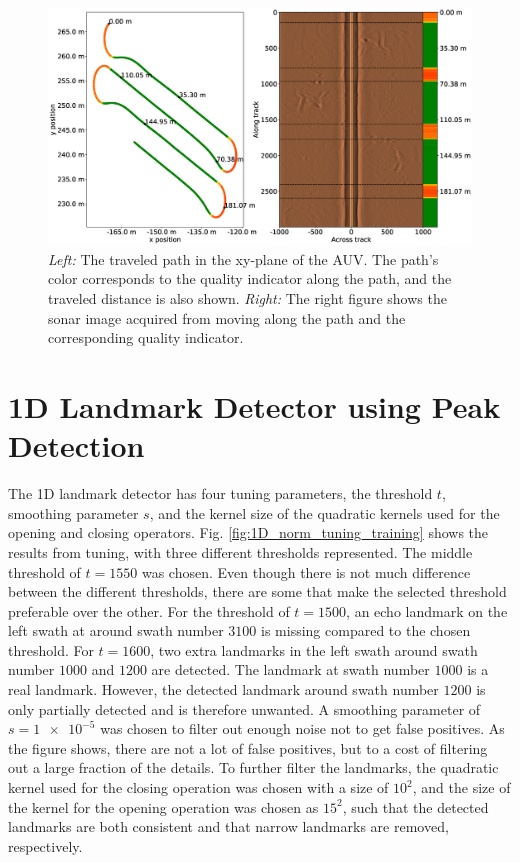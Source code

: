 \begin{figure} %
  \centering
  \includegraphics[width=1.0\textwidth]{figures/path_and_quality_indicator.eps}
  \caption[Path with quality indicator overlayed]{\textit{Left:} The traveled path in the xy-plane of the AUV. The path's color corresponds to the quality indicator along the path, and the traveled distance is also shown. \textit{Right:} The right figure shows the sonar image acquired from moving along the path and the corresponding quality indicator.}
  \label{fig:path_and_quality_ind}
\end{figure}

\section{1D Landmark Detector using Peak Detection}

The 1D landmark detector has four tuning parameters, the threshold $t$, smoothing parameter $s$, and the kernel size of the quadratic kernels used for the opening and closing operators. Fig. \ref{fig:1D_norm_tuning_training} shows the results from tuning, with three different thresholds represented. The middle threshold of $t = 1550$ was chosen. Even though there is not much difference between the different thresholds, there are some that make the selected threshold preferable over the other. For the threshold of $t = 1500$, an echo landmark on the left swath at around swath number $3100$ is missing compared to the chosen threshold. For $t = 1600$, two extra landmarks in the left swath around swath number $1000$ and $1200$ are detected. The landmark at swath number $1000$ is a real landmark. However, the detected landmark around swath number $1200$ is only partially detected and is therefore unwanted. A smoothing parameter of $s = \num{1e-5}$ was chosen to filter out enough noise not to get false positives. As the figure shows, there are not a lot of false positives, but to a cost of filtering out a large fraction of the details. To further filter the landmarks, the quadratic kernel used for the closing operation was chosen with a size of $10^2$, and the size of the kernel for the opening operation was chosen as $15^2$, such that the detected landmarks are both consistent and that narrow landmarks are removed, respectively.  

